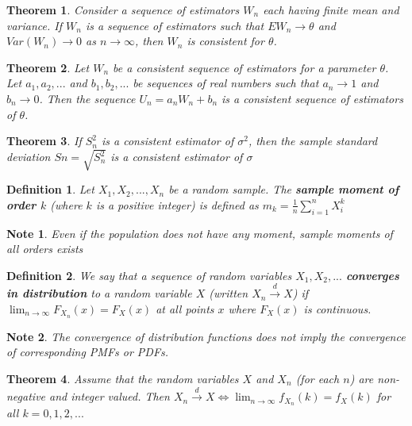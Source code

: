 \documentclass[14pt,twoside]{extreport}
\theoremstyle{dotless}
\newtheorem*{defn}{\footnotesize Definition}
\newtheorem*{thm}{\footnotesize Theorem} %
\newtheorem*{note}{\footnotesize Note} %
\begin{document}
\begin{thm}
    Consider a sequence of estimators $W_n$ each having finite mean and variance. If $W_n$ is a sequence of estimators such that $EW_n \to \theta$ and $Var(W_n) \to 0$ as $n \to \infty$, then $W_n$ is consistent for $\theta$.
\end{thm}

\begin{thm}
    Let $W_n$ be a consistent sequence of estimators for a parameter $\theta$. Let $a_1, a_2, ...$ and $b_1, b_2, ...$ be sequences of real numbers such that $a_n \to 1$ and $b_n \to 0$. Then the sequence $U_n = a_n W_n + b_n$ is a consistent sequence of estimators of $\theta$.
\end{thm}

\begin{thm}
    If $S_n^2$ is a consistent estimator of $\sigma^2$, then the sample standard deviation $Sn = \sqrt{S_n^2}$ is a consistent estimator of $\sigma$
\end{thm}

\begin{defn}
    Let $X_1, X_2, ..., X_n$ be a random sample. The \textbf{sample moment of order $k$} (where $k$ is a positive integer) is defined as $m_k = \frac{1}{n} \sum_{i=1}^n X_i^k$
\end{defn}

\begin{note}
    Even if the population does not have any moment, sample moments of all orders exists
\end{note}

\begin{defn}
    We say that a sequence of random variables $X_1, X_2, ...$ \textbf{converges in distribution} to a random variable $X$ (written $X_n \overset{d}{\to} X$) if $\lim_{n \to \infty} F_{X_n}(x) = F_X(x)$ at all points $x$ where $F_X(x)$ is continuous.
\end{defn}

\begin{note}
    The convergence of distribution functions does not imply the convergence of corresponding PMFs or PDFs.
\end{note}

\begin{thm}
    Assume that the random variables $X$ and $X_n$ (for each $n$) are non-negative and integer valued. Then $X_n \overset{d}{\to} X \iff \lim_{n \to \infty} f_{X_n} (k) = f_X(k)$ for all $k = 0, 1, 2, ...$
\end{thm}
\end{document}
